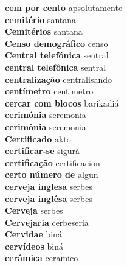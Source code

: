 \textbf{ cem por cento  } apsolutamente \\
\textbf{ cemitério  } santana \\
\textbf{ Cemitérios  } santana \\
\textbf{ Censo demográfico  } censo \\
\textbf{ Central telefónica  } sentral \\
\textbf{ central telefônica  } sentral \\
\textbf{ centralização  } centralisando \\
\textbf{ centímetro  } centimetro \\
\textbf{ cercar com blocos  } barikadiá \\
\textbf{ cerimónia  } seremonia \\
\textbf{ cerimônia  } seremonia \\
\textbf{ Certificado  } akto \\
\textbf{ certificar-se  } sigurá \\
\textbf{ certificação  } certificacion \\
\textbf{ certo número de  } algun \\
\textbf{ cerveja inglesa  } serbes \\
\textbf{ cerveja inglêsa  } serbes \\
\textbf{ Cerveja  } serbes \\
\textbf{ Cervejaria  } cerbeseria \\
\textbf{ Cervidae  } biná \\
\textbf{ cervídeos  } biná \\
\textbf{ cerâmica  } ceramico \\
